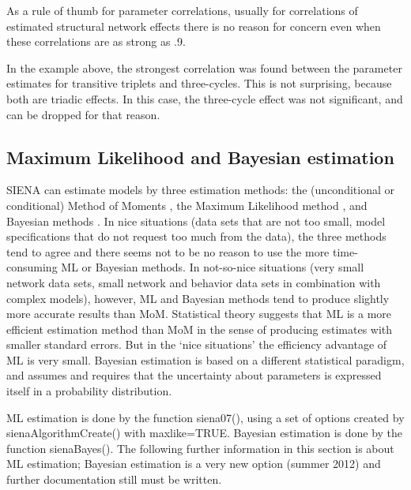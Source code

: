 \documentclass[a4paper,fleqn,11pt]{article}
\newcommand{\+}{\, + \,}
\newcommand{\sfn}[1]{\textsf{#1}}
\newcommand{\SI}{{\sf SIENA }}
\begin{document}
As a rule of thumb for parameter correlations,
usually for correlations of estimated structural network effects there is no
reason for concern even when these correlations
are as strong as .9.

In the example above, the strongest correlation was found between
the parameter estimates for transitive triplets and three-cycles.
This is not surprising, because both are triadic effects.
In this case, the three-cycle effect was not significant,
and can be dropped for that reason.


\subsection{Maximum Likelihood and Bayesian estimation}
\label{S_ML}
\label{S_Bayes}

\SI can estimate models by three estimation methods: the (unconditional or conditional)
Method of Moments \citep*[`MoM', the default; ][]{Snijders01, SnijdersEA07},
the Maximum Likelihood method \citep*[`ML', see][]{SnijdersEA10a},
and Bayesian methods
\citep[see][]{Koskinen04, KoskinenSnijders07, SchweinbergerSnijders07c}.
In nice situations (data sets that are not too small, model specifications
that do not request too much from the data),
the three methods tend to agree
and there seems not to be no reason to use the more time-consuming
ML or Bayesian methods.
In not-so-nice situations (very small network data sets, small network and behavior
data sets in combination with complex models),
however, ML and Bayesian methods tend to produce slightly more accurate results
than MoM.
Statistical theory suggests that ML is a more efficient estimation method
than MoM in the sense of producing estimates with smaller standard errors.
But in the `nice situations' the efficiency advantage of ML is very small.
Bayesian estimation is based on a different statistical paradigm, and
assumes and requires that the uncertainty about parameters is expressed
itself in a probability distribution.

ML estimation is done by the function \sfn{siena07()}, using a set of options
created by \sfn{sienaAlgorithmCreate()} with \sfn{maxlike=TRUE}.
Bayesian estimation is done by the function \sfn{sienaBayes()}.
The following further information in this section is about ML estimation;
Bayesian estimation is a very new option (summer 2012) and further documentation
still must be written.
\end{document}
